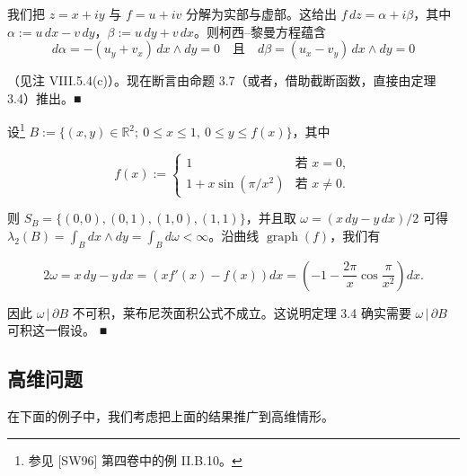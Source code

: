 \begin{example}
\begin{items}
\proofhead
我们把 $ z = x+iy $ 与 $ f = u+iv $ 分解为实部与虚部。这给出 $ f\,dz = \alpha + i\beta $，其中 $ \alpha := u\,dx - v\,dy $，$ \beta := u\,dy + v\,dx $。则柯西–黎曼方程蕴含
\[
d\alpha = -(u_y + v_x)\,dx\wedge dy = 0 \quad \text{且} \quad d\beta = (u_x - v_y)\,dx\wedge dy = 0
\]

（见注 VIII.5.4(c)）。现在断言由命题 3.7（或者，借助截断函数，直接由定理 3.4）推出。\nobreak\hspace{0.35em}■

\item[（d）]

设\footnote{参见 [SW96] 第四卷中的例 II.B.10。} $ B := \{ (x,y)\in\mathbb{R}^2 ;\ 0 \le x \le 1,\ 0 \le y \le f(x) \} $，其中

\begin{equation*}
f(x) := \begin{cases} 1 & \text{若 } x = 0 , \\ 1 + x\sin(\pi/x^2) & \text{若 } x \neq 0 . \end{cases}
\end{equation*}

则 $ S_B = \{ (0,0),(0,1),(1,0),(1,1) \} $，并且取 $ \omega = (x\,dy - y\,dx)/2 $ 可得 $ \lambda_2(B) = \int_B dx\wedge dy = \int_B d\omega < \infty $。沿曲线 $ \operatorname{graph}(f) $，我们有

\[
2\omega = x\,dy - y\,dx = \left(xf'(x) - f(x)\right)dx = \left(-1 - \frac{2\pi}{x}\cos\frac{\pi}{x^2}\right)dx .
\]

因此 $ \omega\,|\,\partial B $ 不可积，莱布尼茨面积公式不成立。这说明定理 3.4 确实需要 $ \omega\,|\,\partial B $ 可积这一假设。 \nobreak\hspace{0.35em}■

\end{items}

\end{example}

\subsection*{高维问题}

在下面的例子中，我们考虑把上面的结果推广到高维情形。

